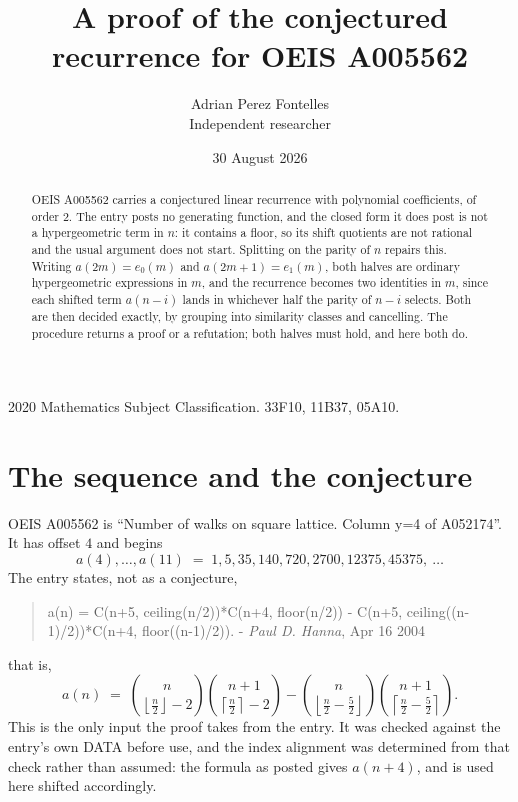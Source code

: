 \documentclass[11pt,a4paper]{article}
\title{A proof of the conjectured recurrence for OEIS A005562}
\author{Adrian Perez Fontelles\\ \small Independent researcher}
\date{30 August 2026}
\theoremstyle{plain}
\theoremstyle{definition}
\begin{document}
\maketitle

\begin{abstract}
OEIS A005562 carries a conjectured linear recurrence with polynomial coefficients, of
order 2. The entry posts no generating function, and the closed form it does post
is not a hypergeometric term in $n$: it contains a floor, so its shift quotients are not
rational and the usual argument does not start. Splitting on the parity of $n$ repairs
this. Writing $a(2m)=e_{0}(m)$ and $a(2m+1)=e_{1}(m)$, both halves are ordinary
hypergeometric expressions in $m$, and the recurrence becomes two identities in $m$, since
each shifted term $a(n-i)$ lands in whichever half the parity of $n-i$ selects. Both are
then decided exactly, by grouping into similarity classes and cancelling. The procedure
returns a proof or a refutation; both halves must hold, and here both do.
\end{abstract}

\noindent\small 2020 Mathematics Subject Classification. 33F10, 11B37, 05A10.\normalsize

\section{The sequence and the conjecture}

OEIS A005562 is ``Number of walks on square lattice. Column y=4 of A052174''. It has offset $4$ and begins
\[
a(4),\dots,a(11)\;=\;1, 5, 35, 140, 720, 2700, 12375, 45375,\ \dots
\]
The entry states, not as a conjecture,
\begin{quote}\small
a(n) = C(n+5, ceiling(n/2))*C(n+4, floor(n/2)) - C(n+5, ceiling((n-1)/2))*C(n+4, floor((n-1)/2)). - \emph{Paul D. Hanna}, Apr 16 2004
\end{quote}
that is,
\begin{equation}\label{eq:cf}
a(n)\;=\;{\binom{n}{\left\lfloor{\frac{n}{2}}\right\rfloor - 2}} {\binom{n + 1}{\left\lceil{\frac{n}{2}}\right\rceil - 2}} - {\binom{n}{\left\lfloor{\frac{n}{2} - \frac{5}{2}}\right\rfloor}} {\binom{n + 1}{\left\lceil{\frac{n}{2} - \frac{5}{2}}\right\rceil}} .
\end{equation}
This is the only input the proof takes from the entry. It was checked against the entry's
own DATA before use, and the index alignment was determined from that check rather than
assumed: the formula as posted gives $a(n+4)$, and is used here shifted accordingly.
\end{document}
